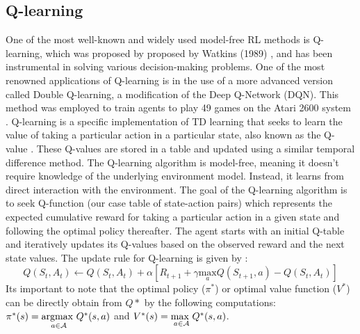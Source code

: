 \subsection{Q-learning}
One of the most well-known and widely used model-free RL methods is Q-learning, which was proposed by proposed by Watkins (1989) \cite{watkins1989}, and has been instrumental in solving various decision-making problems. One of the most renowned applications of Q-learning is in the use of a more advanced version called Double Q-learning, a modification of the Deep Q-Network (DQN). This method was employed to train agents to play 49 games on the Atari 2600 system \cite{van2016double}.
Q-learning is a specific implementation of TD learning that seeks to learn the value of taking a particular action in a particular state, also known as the Q-value \cite{RL}. These Q-values are stored in a table and updated using a similar temporal difference method. The Q-learning algorithm is model-free, meaning it doesn't require knowledge of the underlying environment model. Instead, it learns from direct interaction with the environment.
The goal of the Q-learning algorithm is to seek Q-function (our case table of state-action pairs) which represents the expected cumulative reward for taking a particular action in a given state and following the optimal policy thereafter. The agent starts with an initial Q-table and iteratively updates its Q-values based on the observed reward and the next state values.
The update rule for Q-learning is given by \cite{watkins1992}:
\begin{equation}
    Q(S_t,A_t) \leftarrow
    Q(S_t,A_t) + \alpha
    \left [
    R_{t+1} + \gamma \underset{a}{\text{max}}
    Q(S_{t+1},a) - Q(S_t, A_t)
    \right]
\end{equation}
Its important to note that the optimal policy ($\pi^*$) or optimal value function ($V^*$) can be directly obtain from $Q*$ by the following computations: $\pi^*(s) = \underset{a \in \mathcal A}{\text{argmax }} Q^*(s,a)$ and $V^*(s) = \underset{a \in \mathcal A}{\text{max }} Q^*(s,a)$.


